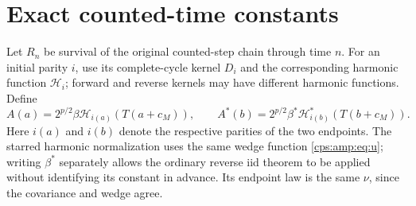 \documentclass[11pt,letterpaper]{article}
\numberwithin{equation}{section}
\theoremstyle{remark}\newtheorem{remark}[theorem]{Remark}
\begin{document}
\section{Exact counted-time constants}\label{cps:amp:sec:clock}
Let $R_n$ be survival of the original counted-step chain through time $n$. For an initial parity $i$, use its complete-cycle kernel $D_i$ and the corresponding harmonic function $\mathcal H_i$; forward and reverse kernels may have different harmonic functions. Define
\begin{equation}\label{cps:amp:eq:A}
 A(a)=2^{p/2}\beta\mathcal H_{i(a)}(T(a+c_M)),\qquad
 A^*(b)=2^{p/2}\beta^*\mathcal H_{i(b)}^*(T(b+c_M)).
\end{equation}
Here $i(a)$ and $i(b)$ denote the respective parities of the two endpoints. The starred harmonic normalization uses the same wedge function \eqref{cps:amp:eq:u}; writing $\beta^*$ separately allows the ordinary reverse iid theorem to be applied without identifying its constant in advance. Its endpoint law is the same $\nu$, since the covariance and wedge agree.
\end{document}
